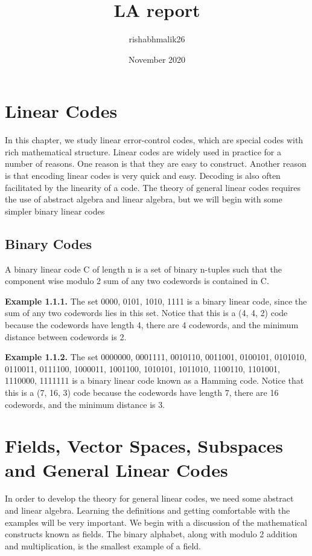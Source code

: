 \documentclass{article}
\title{LA report}
\author{rishabhmalik26 }
\date{November 2020}
\begin{document}
\maketitle

\section{Linear Codes}
In this chapter, we study linear error-control codes, which are special codes with rich mathematical
structure. Linear codes are widely used in practice for a number of reasons. One reason is that they
are easy to construct. Another reason is that encoding linear codes is very quick and easy. Decoding
is also often facilitated by the linearity of a code. The theory of general linear codes requires the
use of abstract algebra and linear algebra, but we will begin with some simpler binary linear codes

\subsection{Binary Codes}
A binary linear code C of length n is a set of binary n-tuples such that the
component wise modulo 2 sum of any two codewords is contained in C.

\textbf{Example 1.1.1.} The set {0000, 0101, 1010, 1111} is a binary linear code, since the sum of any two
codewords lies in this set. Notice that this is a (4, 4, 2) code because the codewords have length 4,
there are 4 codewords, and the minimum distance between codewords is 2.

\textbf{Example 1.1.2.} The set {0000000, 0001111, 0010110, 0011001, 0100101, 0101010, 0110011, 0111100,
1000011, 1001100, 1010101, 1011010, 1100110, 1101001, 1110000, 1111111} is a binary linear code
known as a Hamming code. Notice that this is a (7, 16, 3) code because the codewords have length
7, there are 16 codewords, and the minimum distance is 3.

\section{Fields, Vector Spaces, Subspaces and General Linear Codes}
In order to develop the theory for general linear codes, we need some abstract and linear algebra.
Learning the definitions and getting comfortable with the examples will be very important.
We begin with a discussion of the mathematical constructs known as fields. The binary alphabet, along 
with modulo 2 addition and multiplication, is the smallest example of a field. 
\end{document}
